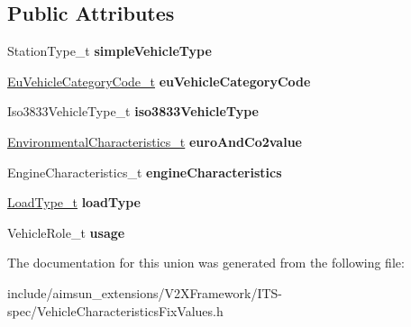 \subsection*{Public Attributes}
\begin{DoxyCompactItemize}
\item 
Station\+Type\+\_\+t {\bfseries simple\+Vehicle\+Type}\hypertarget{unionVehicleCharacteristicsFixValues_1_1VehicleCharacteristicsFixValues__u_a45d24cf90617e7a18b6886d9b0fb70c7}{}\label{unionVehicleCharacteristicsFixValues_1_1VehicleCharacteristicsFixValues__u_a45d24cf90617e7a18b6886d9b0fb70c7}

\item 
\hyperlink{structEuVehicleCategoryCode}{Eu\+Vehicle\+Category\+Code\+\_\+t} {\bfseries eu\+Vehicle\+Category\+Code}\hypertarget{unionVehicleCharacteristicsFixValues_1_1VehicleCharacteristicsFixValues__u_ac1edc02efc401bf8753a67a4ee45f34b}{}\label{unionVehicleCharacteristicsFixValues_1_1VehicleCharacteristicsFixValues__u_ac1edc02efc401bf8753a67a4ee45f34b}

\item 
Iso3833\+Vehicle\+Type\+\_\+t {\bfseries iso3833\+Vehicle\+Type}\hypertarget{unionVehicleCharacteristicsFixValues_1_1VehicleCharacteristicsFixValues__u_a4dcc53cb92537dde8016c08a6592dbea}{}\label{unionVehicleCharacteristicsFixValues_1_1VehicleCharacteristicsFixValues__u_a4dcc53cb92537dde8016c08a6592dbea}

\item 
\hyperlink{structEnvironmentalCharacteristics}{Environmental\+Characteristics\+\_\+t} {\bfseries euro\+And\+Co2value}\hypertarget{unionVehicleCharacteristicsFixValues_1_1VehicleCharacteristicsFixValues__u_a6ffc720606a78ff200089d5a1256a2ba}{}\label{unionVehicleCharacteristicsFixValues_1_1VehicleCharacteristicsFixValues__u_a6ffc720606a78ff200089d5a1256a2ba}

\item 
Engine\+Characteristics\+\_\+t {\bfseries engine\+Characteristics}\hypertarget{unionVehicleCharacteristicsFixValues_1_1VehicleCharacteristicsFixValues__u_a59c9d40ad004ce75563d43baa285fc82}{}\label{unionVehicleCharacteristicsFixValues_1_1VehicleCharacteristicsFixValues__u_a59c9d40ad004ce75563d43baa285fc82}

\item 
\hyperlink{structLoadType}{Load\+Type\+\_\+t} {\bfseries load\+Type}\hypertarget{unionVehicleCharacteristicsFixValues_1_1VehicleCharacteristicsFixValues__u_a4e50ca013ca695b9cc0af157f57dc1f8}{}\label{unionVehicleCharacteristicsFixValues_1_1VehicleCharacteristicsFixValues__u_a4e50ca013ca695b9cc0af157f57dc1f8}

\item 
Vehicle\+Role\+\_\+t {\bfseries usage}\hypertarget{unionVehicleCharacteristicsFixValues_1_1VehicleCharacteristicsFixValues__u_a568642e9086601086bfda6a5ce8c7478}{}\label{unionVehicleCharacteristicsFixValues_1_1VehicleCharacteristicsFixValues__u_a568642e9086601086bfda6a5ce8c7478}

\end{DoxyCompactItemize}


The documentation for this union was generated from the following file\+:\begin{DoxyCompactItemize}
\item 
include/aimsun\+\_\+extensions/\+V2\+X\+Framework/\+I\+T\+S-\/spec/Vehicle\+Characteristics\+Fix\+Values.\+h\end{DoxyCompactItemize}
